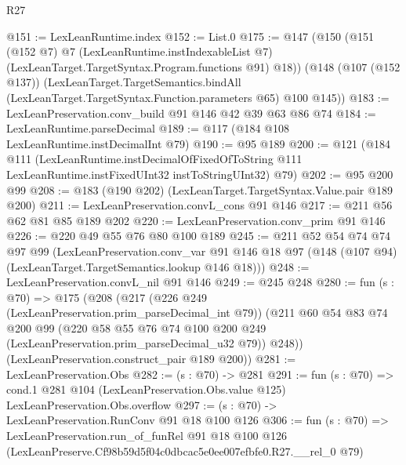 \begin{lexlean}{R27}
\begin{coremodule}
@151 := LexLeanRuntime.index
@152 := List.{0}
@175 := @147
    (@150
      (@151
        (@152 @7)
        @7
        (LexLeanRuntime.instIndexableList @7)
        (LexLeanTarget.TargetSyntax.Program.functions @91)
        @18))
    (@148
      (@107 (@152 @137))
      (LexLeanTarget.TargetSemantics.bindAll
        (LexLeanTarget.TargetSyntax.Function.parameters @65)
        @100
        @145))
@183 := LexLeanPreservation.conv_build @91 @146 @42 @39 @63 @86 @74
@184 := LexLeanRuntime.parseDecimal
@189 := @117 (@184 @108 LexLeanRuntime.instDecimalInt @79)
@190 := @95 @189
@200 := @121
    (@184
      @111
      (LexLeanRuntime.instDecimalOfFixedOfToString
        @111
        LexLeanRuntime.instFixedUInt32
        instToStringUInt32)
      @79)
@202 := @95 @200 @99
@208 := @183 (@190 @202) (LexLeanTarget.TargetSyntax.Value.pair @189 @200)
@211 := LexLeanPreservation.convL_cons @91 @146
@217 := @211 @56 @62 @81 @85 @189 @202
@220 := LexLeanPreservation.conv_prim @91 @146
@226 := @220 @49 @55 @76 @80 @100 @189
@245 := @211
    @52
    @54
    @74
    @74
    @97
    @99
    (LexLeanPreservation.conv_var
      @91
      @146
      @18
      @97
      (@148 (@107 @94) (LexLeanTarget.TargetSemantics.lookup @146 @18)))
@248 := LexLeanPreservation.convL_nil @91 @146
@249 := @245 @248
@280 := fun (s : @70) =>
  @175
    (@208
      (@217
        (@226 @249 (LexLeanPreservation.prim_parseDecimal_int @79))
        (@211
          @60
          @54
          @83
          @74
          @200
          @99
          (@220 @58 @55 @76 @74 @100 @200 @249 (LexLeanPreservation.prim_parseDecimal_u32 @79))
          @248))
      (LexLeanPreservation.construct_pair @189 @200))
@281 := LexLeanPreservation.Obs
@282 := (s : @70) -> @281
@291 := fun (s : @70) =>
  cond.{1} @281 @104 (LexLeanPreservation.Obs.value @125) LexLeanPreservation.Obs.overflow
@297 := (s : @70) -> LexLeanPreservation.RunConv @91 @18 @100 @126
@306 := fun (s : @70) =>
  LexLeanPreservation.run_of_funRel
    @91
    @18
    @100
    @126
    (LexLeanPreserve.Cf98b59d5f04c0dbcac5e0ee007efbfe0.R27.__rel_0 @79)
\end{coremodule}
\end{lexlean}
